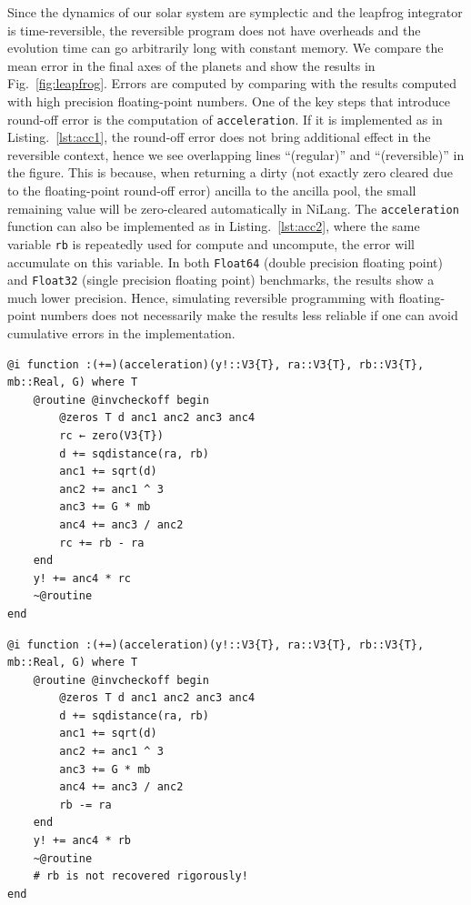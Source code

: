 \documentclass{article}
\newcommand{\<}{\langle}
\renewcommand{\>}{\rangle}
\newcommand{\Fig}[1]{Fig.~\ref{#1}}
\newcommand{\Lst}[1]{Listing.~\ref{#1}}
\theoremstyle{definition}\newtheorem{definition}{\textit{Definition}}
\begin{document}
Since the dynamics of our solar system are symplectic and the leapfrog integrator is time-reversible, the reversible program does not have overheads and the evolution time can go arbitrarily long with constant memory.
We compare the mean error in the final axes of the planets and show the results in \Fig{fig:leapfrog}.
Errors are computed by comparing with the results computed with high precision floating-point numbers.
One of the key steps that introduce round-off error is the computation of \texttt{acceleration}. If it is implemented as in \Lst{lst:acc1}, the round-off error does not bring additional effect in the reversible context, hence we see overlapping lines ``(regular)'' and ``(reversible)'' in the figure.
This is because, when returning a dirty (not exactly zero cleared due to the floating-point round-off error) ancilla to the ancilla pool, the small remaining value will be zero-cleared automatically in NiLang.
The \texttt{acceleration} function can also be implemented as in \Lst{lst:acc2}, where the same variable \texttt{rb} is repeatedly used for compute and uncompute, the error will accumulate on this variable.
In both \texttt{Float64} (double precision floating point) and \texttt{Float32} (single precision floating point) benchmarks, the results show a much lower precision.
Hence, simulating reversible programming with floating-point numbers does not necessarily make the results less reliable if one can avoid cumulative errors in the implementation.

\begin{minipage}{.45\textwidth}
    \begin{lstlisting}[mathescape=true,caption={Compute the acceleration. Compute and uncompute on ancilla \texttt{rc}},label={lst:acc1}, frame=tlrb]
@i function :(+=)(acceleration)(y!::V3{T}, ra::V3{T}, rb::V3{T}, mb::Real, G) where T
    @routine @invcheckoff begin
        @zeros T d anc1 anc2 anc3 anc4
        rc ← zero(V3{T})
        d += sqdistance(ra, rb)
        anc1 += sqrt(d)
        anc2 += anc1 ^ 3
        anc3 += G * mb
        anc4 += anc3 / anc2
        rc += rb - ra
    end
    y! += anc4 * rc
    ~@routine
end
\end{lstlisting}
\end{minipage}
\hfill
\begin{minipage}{.45\textwidth}
    \begin{lstlisting}[mathescape=true,caption={Compute the acceleration. Compute and uncompute on the input variable \texttt{rb}.},label={lst:acc2}, frame=tlrb]
@i function :(+=)(acceleration)(y!::V3{T}, ra::V3{T}, rb::V3{T}, mb::Real, G) where T
    @routine @invcheckoff begin
        @zeros T d anc1 anc2 anc3 anc4
        d += sqdistance(ra, rb)
        anc1 += sqrt(d)
        anc2 += anc1 ^ 3
        anc3 += G * mb
        anc4 += anc3 / anc2
        rb -= ra
    end
    y! += anc4 * rb
    ~@routine
    # rb is not recovered rigorously!
end
\end{lstlisting}
\end{minipage}
\end{document}
